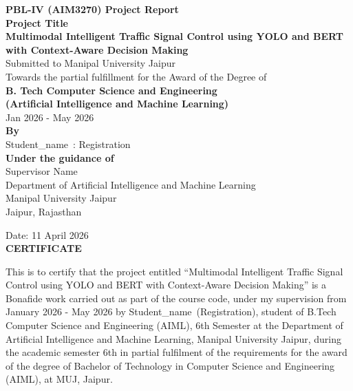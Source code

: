 \documentclass[12pt,a4paper]{report}
\newcommand{\projectTitle}{Multimodal Intelligent Traffic Signal Control using YOLO and BERT with Context-Aware Decision Making}
\newcommand{\studentName}{Student\_name}
\newcommand{\registrationNumber}{Registration}
\newcommand{\supervisorName}{Supervisor Name}
\newcommand{\submissionDate}{11 April 2026}
\begin{document}
\begin{titlepage}
\begin{center}
\vspace*{1.2cm}
{\Large \textbf{PBL-IV (AIM3270) Project Report}}\\[1.2cm]

{\large \textbf{Project Title}}\\[0.3cm]
{\Large \textbf{\projectTitle}}\\[1.2cm]

Submitted to Manipal University Jaipur\\[0.2cm]
Towards the partial fulfillment for the Award of the Degree of\\[0.2cm]
\textbf{B. Tech Computer Science and Engineering}\\
\textbf{(Artificial Intelligence and Machine Learning)}\\[1cm]

Jan 2026 - May 2026\\[1cm]

\textbf{By}\\[0.4cm]
\studentName\ : \registrationNumber\\[1cm]

\textbf{Under the guidance of}\\[0.4cm]
\supervisorName\\[1cm]

Department of Artificial Intelligence and Machine Learning\\
Manipal University Jaipur\\
Jaipur, Rajasthan
\end{center}
\end{titlepage}

\clearpage
\thispagestyle{empty}
\begin{center}
{\large Date: \submissionDate}\\[1cm]
{\Large \textbf{CERTIFICATE}}\\[1cm]
\end{center}

This is to certify that the project entitled ``\projectTitle'' is a Bonafide work carried out as part of the course code, under my supervision from January 2026 - May 2026 by \studentName\ (\registrationNumber), student of B.Tech Computer Science and Engineering (AIML), 6th Semester at the Department of Artificial Intelligence and Machine Learning, Manipal University Jaipur, during the academic semester 6th in partial fulfilment of the requirements for the award of the degree of Bachelor of Technology in Computer Science and Engineering (AIML), at MUJ, Jaipur.
\end{document}
